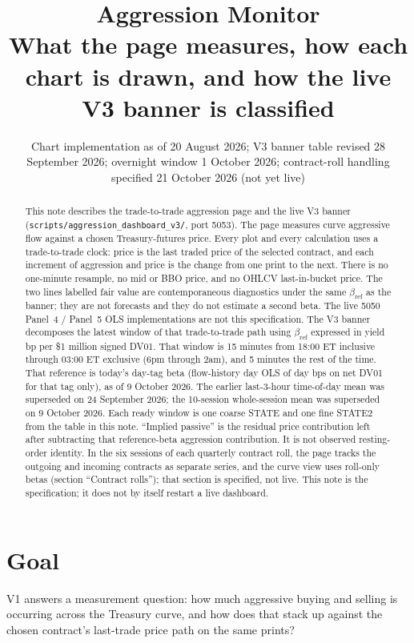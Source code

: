 \documentclass[11pt]{article}
\title{\textbf{Aggression Monitor}\\[0.4em]
\large What the page measures, how each chart is drawn, and how the live V3 banner is classified}
\author{}
\date{Chart implementation as of 20 August 2026; V3 banner table revised 28 September 2026; overnight window 1 October 2026; contract-roll handling specified 21 October 2026 (not yet live)}
\begin{document}
\maketitle

\begin{abstract}
This note describes the trade-to-trade aggression page and the live V3 banner (\texttt{scripts/aggression\_dashboard\_v3/}, port 5053). The page measures curve aggressive flow against a chosen Treasury-futures price. Every plot and every calculation uses a trade-to-trade clock: price is the last traded price of the selected contract, and each increment of aggression and price is the change from one print to the next. There is no one-minute resample, no mid or BBO price, and no OHLCV last-in-bucket price. The two lines labelled fair value are contemporaneous diagnostics under the same $\beta_{\mathrm{ref}}$ as the banner; they are not forecasts and they do not estimate a second beta. The live 5050 Panel~4 / Panel~5 OLS implementations are not this specification. The V3 banner decomposes the latest window of that trade-to-trade path using $\beta_{\mathrm{ref}}$ expressed in yield bp per \$1 million signed DV01. That window is 15 minutes from 18:00 ET inclusive through 03:00 ET exclusive (6pm through 2am), and 5 minutes the rest of the time. That reference is today's day-tag beta (flow-history day OLS of day bps on net DV01 for that tag only), as of 9 October 2026. The earlier last-3-hour time-of-day mean was superseded on 24 September 2026; the 10-session whole-session mean was superseded on 9 October 2026. Each ready window is one coarse STATE and one fine STATE2 from the table in this note. ``Implied passive'' is the residual price contribution left after subtracting that reference-beta aggression contribution. It is not observed resting-order identity. In the six sessions of each quarterly contract roll, the page tracks the outgoing and incoming contracts as separate series, and the curve view uses roll-only betas (section ``Contract rolls''); that section is specified, not live. This note is the specification; it does not by itself restart a live dashboard.
\end{abstract}

\tableofcontents
\clearpage

\section{Goal}

V1 answers a measurement question: how much aggressive buying and selling is occurring across the Treasury curve, and how does that stack up against the chosen contract's last-trade price path on the same prints? 
\end{document}
